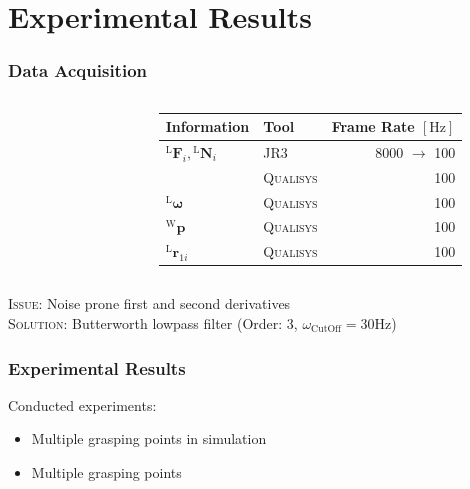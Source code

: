 \documentclass[student,noshadow]{ITRslides}
\renewcommand{\vec}[1]{\boldsymbol{#1}}
\renewcommand{\vec}[1]{\boldsymbol{#1}}
\newcommand{\scr}[1]{\mathrm{#1}}
\begin{document}
\section{Experimental Results}
\begin{frame}
	\frametitle{Data Acquisition}
	\begin{columns}
	\begin{column}{0.35\textwidth}
				\begin{figure}
					\centering
					
				\end{figure}	
		 	\end{column}
		 	\begin{column}{0.65\textwidth}
		 	\begin{tabular}{llr}
				\toprule
				Information    & Tool & Frame Rate $\left[\mathrm{Hz}\right]$ \\
				\midrule
				${^\scr{L}}\vec{F}_{i},{^\scr{L}}\vec{N}_{i}$      & \textsc{JR3}    & 8000 $\rightarrow$ 100      \\
				          & \textsc{Qualisys}        & 100       \\
				$^\scr{L}\vec{\omega}$       & \textsc{Qualisys}     & 100      \\
				$^\scr{W}\vec{p}$       & \textsc{Qualisys}     & 100      \\
				$^\scr{L}\vec{r}_{1i}$ & \textsc{Qualisys}      & 100       \\
				\bottomrule
			\end{tabular}
		 	\end{column}
	\end{columns}
	\textsc{Issue}: Noise prone first and second derivatives\\
	\textsc{Solution}: Butterworth lowpass filter (Order: 3, $\omega_\mathrm{CutOff} = 30 \mathrm{Hz}$)
\end{frame}

\begin{frame}
	\frametitle{Experimental Results}
	Conducted experiments:
	\vspace{0.5cm}
	\begin{itemize}
		\item Multiple grasping points in simulation
		\item Multiple grasping points
	\end{itemize}
\end{frame}
\end{document}
